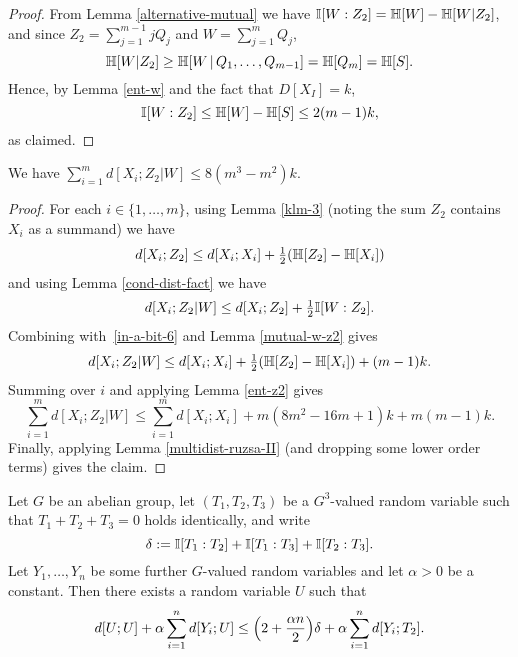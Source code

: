 \begin{proof}
  From Lemma \ref{alternative-mutual} we have $\mathbb{I}[W : Z_2] = \mathbb{H}[W] - \mathbb{H}[W | Z_2]$, and since $Z_2 = \sum_{j=1}^{m-1} j Q_j$ and $W = \sum_{j=1}^m Q_j$,
  \[
    \mathbb{H}[W | Z_2] \geq \mathbb{H}[W \,|\, Q_1,\dots,Q_{m-1}] = \mathbb{H}[Q_m] = \mathbb{H}[S].
  \]
  Hence, by Lemma \ref{ent-w} and the fact that $D[X_I] = k$,
  \[
    \mathbb{I}[W : Z_2] \leq \mathbb{H}[W] - \mathbb{H}[S] \leq 2 (m-1) k,
  \]
  as claimed.
\end{proof}

\begin{lemma}\label{xi-z2-w-dist} We have $\sum_{i=1}^m d[X_i;Z_2|W] \leq 8(m^3-m^2) k$.
\end{lemma}

\begin{proof}
  For each $i \in \{1,\dots, m\}$, using Lemma \ref{klm-3} (noting the sum $Z_2$ contains $X_i$ as a summand) we have
  \begin{equation}\label{in-a-bit-6}
    d[X_i;Z_2] \leq d[X_i;X_i] + \tfrac12 (\mathbb{H}[Z_2] - \mathbb{H}[X_i])
  \end{equation}
  and using Lemma \ref{cond-dist-fact} we have
  \[
    d[X_i;Z_2 | W] \leq d[X_i;Z_2] + \tfrac12 \mathbb{I}[W : Z_2].
  \]
 Combining with~\eqref{in-a-bit-6} and Lemma \ref{mutual-w-z2} gives
 \[ d[X_i;Z_2 | W] \leq d[X_i;X_i] + \tfrac12 (\mathbb{H}[Z_2] - \mathbb{H}[X_i]) + (m-1)k.\]
 Summing over $i$ and applying Lemma \ref{ent-z2} gives
 \[ \sum_{i = 1}^m d[X_i;Z_2 | W] \leq \sum_{i = 1}^m d[X_i;X_i] + m(8m^2-16m+1) k + m(m-1) k.\]
Finally, applying Lemma \ref{multidist-ruzsa-II} (and dropping some lower order terms) gives the claim.
\end{proof}

\begin{lemma}
  \label{lem:get-better}
  Let $G$ be an abelian group, let $(T_1,T_2,T_3)$ be a $G^3$-valued random variable such that $T_1+T_2+T_3=0$ holds identically, and write
  \[
    \delta := \mathbb{I}[T_1 : T_2] + \mathbb{I}[T_1 : T_3] + \mathbb{I}[T_2 : T_3].
  \]
  Let $Y_1,\dots,Y_n$ be some further $G$-valued random variables and let $\alpha>0$ be a constant.
  Then there exists a random variable $U$ such that
  \begin{equation}
    \label{eq:get-better}
    d[U;U] + \alpha \sum_{i=1}^n d[Y_i;U] \leq \Bigl(2 + \frac{\alpha n}{2} \Bigr) \delta + \alpha \sum_{i=1}^n d[Y_i;T_2].
  \end{equation}
\end{lemma}

